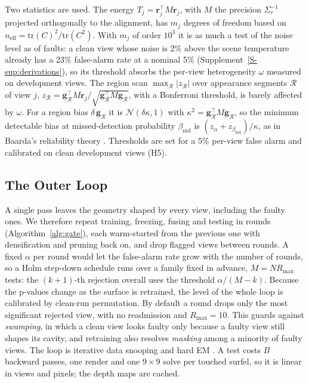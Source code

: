 Two statistics are used. The energy $T_j=\mathbf{r}_j^{\top}M\mathbf{r}_j$, with $M$ the precision
$\Sigma_r^{-1}$ projected orthogonally to the alignment, has $m_j$ degrees of freedom based on
$n_{\mathrm{eff}}=\mathrm{tr}(C)^{2}/\mathrm{tr}(C^{2})$. With $m_j$ of order $10^{3}$ it is as much a test
of the noise level as of faults: a clean view whose noise is 2\% above the scene temperature already has a
23\% false-alarm rate at a nominal 5\% (Supplement~\ref{S-sup:derivations}), so its threshold absorbs the per-view heterogeneity $\omega$
measured on development views. The region scan $\max_{\mathcal{R}}|z_{\mathcal{R}}|$ over appearance
segments $\mathcal{R}$ of view $j$,
$z_{\mathcal{R}}=\mathbf{g}_{\mathcal{R}}^{\top}M\mathbf{r}_j/\sqrt{\mathbf{g}_{\mathcal{R}}^{\top}M\mathbf{g}_{\mathcal{R}}}$,
with a Bonferroni threshold, is barely affected by $\omega$. For a region bias $\delta\,\mathbf{g}_{\mathcal{R}}$
it is $\mathcal{N}(\delta\kappa,1)$ with $\kappa^{2}=\mathbf{g}_{\mathcal{R}}^{\top}M\mathbf{g}_{\mathcal{R}}$, so
the minimum detectable bias at missed-detection probability $\beta_{\mathrm{md}}$ is
$(z_\alpha+z_{\beta_{\mathrm{md}}})/\kappa$, as in Baarda's reliability theory \cite{stat_teunissen_dia}.
Thresholds are set for a 5\% per-view false alarm and calibrated on clean development views (H5).

\subsection{The Outer Loop}
\label{sec:method:loop}
A single pass leaves the geometry shaped by every view, including the faulty ones. We therefore repeat
training, freezing, fusing and testing in rounds (Algorithm~\ref{alg:gate}), each warm-started from the
previous one with densification and pruning back on, and drop flagged views between rounds. A fixed
$\alpha$ per round would let the false-alarm rate grow with the number of rounds, so a Holm step-down
\cite{stat_holm} schedule runs over a family fixed in advance, $M=NR_{\max}$ tests: the $(k{+}1)$-th rejection overall uses
the threshold $\alpha/(M-k)$. Because the p-values change as the surface is retrained, the level of the
whole loop is calibrated by clean-run permutation. By default a round drops only the most significant
rejected view, with no readmission and $R_{\max}=10$. This guards against \emph{swamping}, in which a clean
view looks faulty only because a faulty view still shapes its cavity, and retraining also resolves
\emph{masking} among a minority of faulty views. The loop is iterative data snooping
\cite{stat_teunissen_dia} and hard EM \cite{stat_dempster_em}. A test costs $B$ backward passes, one render
and one $9\times9$ solve per touched surfel, so it is linear in views and pixels; the depth maps are cached.

